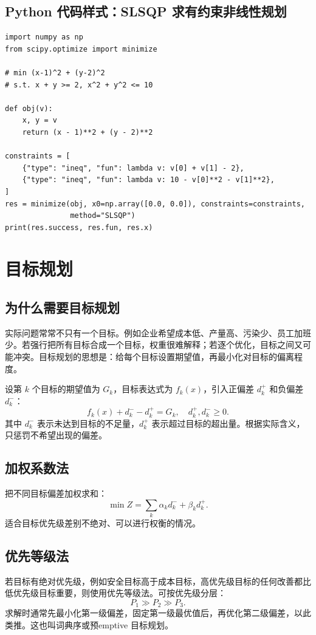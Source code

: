 \documentclass[11pt,a4paper]{ctexart}
\begin{document}
\subsection{Python 代码样式：SLSQP 求有约束非线性规划}
\begin{lstlisting}
import numpy as np
from scipy.optimize import minimize

# min (x-1)^2 + (y-2)^2
# s.t. x + y >= 2, x^2 + y^2 <= 10

def obj(v):
    x, y = v
    return (x - 1)**2 + (y - 2)**2

constraints = [
    {"type": "ineq", "fun": lambda v: v[0] + v[1] - 2},
    {"type": "ineq", "fun": lambda v: 10 - v[0]**2 - v[1]**2},
]
res = minimize(obj, x0=np.array([0.0, 0.0]), constraints=constraints,
               method="SLSQP")
print(res.success, res.fun, res.x)
\end{lstlisting}

\section{目标规划}

\subsection{为什么需要目标规划}
实际问题常常不只有一个目标。例如企业希望成本低、产量高、污染少、员工加班少。若强行把所有目标合成一个目标，权重很难解释；若逐个优化，目标之间又可能冲突。目标规划的思想是：给每个目标设置期望值，再最小化对目标的偏离程度。

设第 $k$ 个目标的期望值为 $G_k$，目标表达式为 $f_k(x)$，引入正偏差 $d_k^+$ 和负偏差 $d_k^-$：
\begin{equation}
f_k(x)+d_k^- - d_k^+ = G_k,
\quad d_k^+,d_k^-\ge0.
\end{equation}
其中 $d_k^-$ 表示未达到目标的不足量，$d_k^+$ 表示超过目标的超出量。根据实际含义，只惩罚不希望出现的偏差。

\subsection{加权系数法}
把不同目标偏差加权求和：
\begin{equation}
\min Z=\sum_k \alpha_k d_k^- + \beta_k d_k^+.
\end{equation}
适合目标优先级差别不绝对、可以进行权衡的情况。

\subsection{优先等级法}
若目标有绝对优先级，例如安全目标高于成本目标，高优先级目标的任何改善都比低优先级目标重要，则使用优先等级法。可按优先级分层：
\[
P_1\gg P_2\gg P_3.
\]
求解时通常先最小化第一级偏差，固定第一级最优值后，再优化第二级偏差，以此类推。这也叫词典序或预emptive 目标规划。
\end{document}

